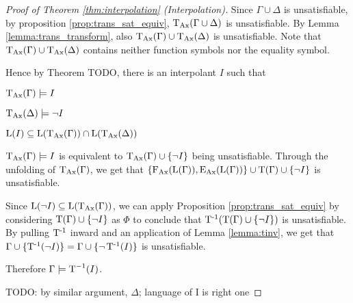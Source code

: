 \begin{proof}[Proof of Theorem \ref{thm:interpolation} (Interpolation)]
	Since $\Gamma \cup \Delta$ is unsatisfiable,
	by proposition \ref{prop:trans_sat_equiv}, $\operatorname{\operatorname{T}_{Ax}}(\Gamma \cup \Delta)$ is unsatisfiable.
	By Lemma \ref{lemma:trans_transform}, also $\operatorname{\operatorname{T}_{Ax}}(\Gamma) \cup \operatorname{\operatorname{T}_{Ax}}(\Delta)$ is unsatisfiable.
	Note that $\operatorname{\operatorname{T}_{Ax}}(\Gamma) \cup \operatorname{\operatorname{T}_{Ax}}(\Delta)$ contains neither function symbols nor the equality symbol.

	Hence by Theorem TODO, there is an interpolant $I$ such that
	\begin{compactenum}
	\item $\operatorname{\operatorname{T}_{Ax}}(\Gamma) \models I$
	\item $\operatorname{\operatorname{T}_{Ax}}(\Delta) \models \lnot I$ 
	\item $\operatorname{L}(I) \subseteq \operatorname{L}(\operatorname{\operatorname{T}_{Ax}}(\Gamma)) \cap \operatorname{L}(\operatorname{\operatorname{T}_{Ax}}(\Delta))$
	\end{compactenum}

	$\operatorname{\operatorname{T}_{Ax}}(\Gamma) \models I$ is equivalent to $\operatorname{\operatorname{T}_{Ax}}(\Gamma) \cup \{\lnot I\}$ being unsatisfiable.
	Through the unfolding of $\operatorname{\operatorname{T}_{Ax}}(\Gamma)$, we get that 
	$\{\operatorname{F_{Ax}}(\operatorname{L}(\Gamma)), \operatorname{E_{Ax}}(\operatorname{L}(\Gamma))\} \cup \operatorname{T}(\Gamma) \cup \{\lnot I\}$ is unsatisfiable.

	Since $\operatorname{L}(\lnot I) \subseteq \operatorname{L}(\operatorname{\operatorname{T}_{Ax}}(\Gamma))$, we can apply Proposition \ref{prop:trans_sat_equiv} by considering $\operatorname{T}(\Gamma) \cup \{\lnot I\}$ as $\Phi$ to conclude that $\operatorname{T^{-1}}(\operatorname{T}(\Gamma) \cup \{\lnot I\})$ is unsatisfiable. By pulling $\operatorname{T^{-1}}$ inward and an application of Lemma \ref{lemma:tinv}, we get that $\Gamma \cup \{\operatorname{T^{-1}}(\lnot I)\} = \Gamma \cup \{\lnot \operatorname{T^{-1}}(I)\}$ is unsatisfiable. 

	Therefore $\Gamma \models \operatorname{T}^{-1}(I)$.

	TODO: by similar argument, $\Delta$; language of I is right one
\end{proof}


